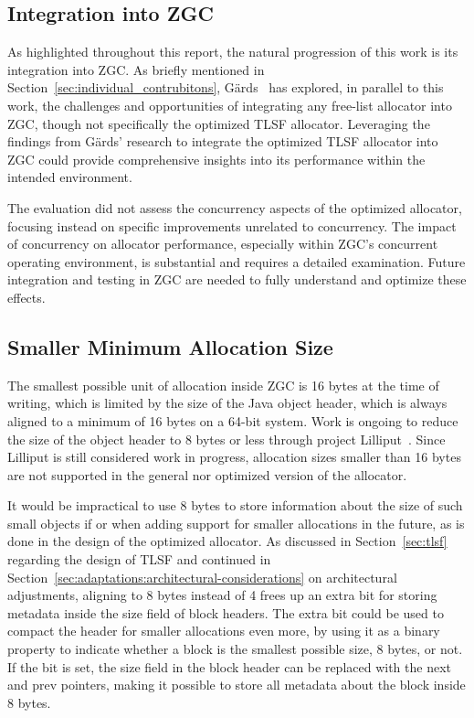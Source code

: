 
\subsection{Integration into ZGC}
\label{sec:future-work:integration}

As highlighted throughout this report, the natural progression of this work is its integration into ZGC. As briefly mentioned in Section~\ref{sec:individual_contrubitons}, Gärds~\cite{niclas} has explored, in parallel to this work, the challenges and opportunities of integrating any free-list allocator into ZGC, though not specifically the optimized TLSF allocator. Leveraging the findings from Gärds’ research to integrate the optimized TLSF allocator into ZGC could provide comprehensive insights into its performance within the intended environment.

The evaluation did not assess the concurrency aspects of the optimized allocator, focusing instead on specific improvements unrelated to concurrency. The impact of concurrency on allocator performance, especially within ZGC's concurrent operating environment, is substantial and requires a detailed examination. Future integration and testing in ZGC are needed to fully understand and optimize these effects.

\subsection{Smaller Minimum Allocation Size}
\label{sec:future-work:lilliput}

The smallest possible unit of allocation inside ZGC is 16 bytes at the time of writing, which is limited by the size of the Java object header, which is always aligned to a minimum of 16 bytes on a 64-bit system. Work is ongoing to reduce the size of the object header to 8 bytes or less through project Lilliput~\cite{lilliput}. Since Lilliput is still considered work in progress, allocation sizes smaller than 16 bytes are not supported in the general nor optimized version of the allocator.

It would be impractical to use 8 bytes to store information about the size of such small objects if or when adding support for smaller allocations in the future, as is done in the design of the optimized allocator. As discussed in Section~\ref{sec:tlsf} regarding the design of TLSF and continued in Section~\ref{sec:adaptations:architectural-considerations} on architectural adjustments, aligning to 8 bytes instead of 4 frees up an extra bit for storing metadata inside the size field of block headers. The extra bit could be used to compact the header for smaller allocations even more, by using it as a binary property to indicate whether a block is the smallest possible size, 8 bytes, or not. If the bit is set, the size field in the block header can be replaced with the next and prev pointers, making it possible to store all metadata about the block inside 8 bytes.

